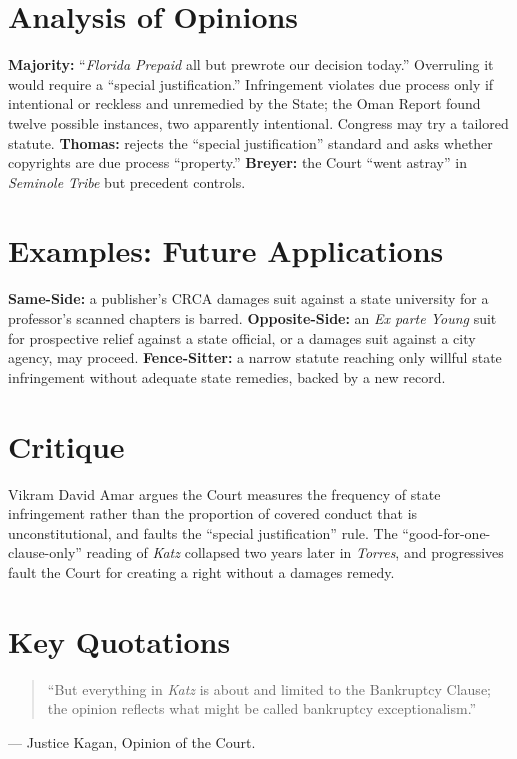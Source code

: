 \documentclass[12pt]{article}
\begin{document}
\section{Analysis of Opinions}
\textbf{Majority:} ``\textit{Florida Prepaid} all but prewrote our decision today.'' Overruling it would require a ``special justification.'' Infringement violates due process only if intentional or reckless and unremedied by the State; the Oman Report found twelve possible instances, two apparently intentional. Congress may try a tailored statute. \textbf{Thomas:} rejects the ``special justification'' standard and asks whether copyrights are due process ``property.'' \textbf{Breyer:} the Court ``went astray'' in \textit{Seminole Tribe} but precedent controls.

\section{Examples: Future Applications}
\textbf{Same-Side:} a publisher's CRCA damages suit against a state university for a professor's scanned chapters is barred. \textbf{Opposite-Side:} an \textit{Ex parte Young} suit for prospective relief against a state official, or a damages suit against a city agency, may proceed. \textbf{Fence-Sitter:} a narrow statute reaching only willful state infringement without adequate state remedies, backed by a new record.

\section{Critique}
Vikram David Amar argues the Court measures the frequency of state infringement rather than the proportion of covered conduct that is unconstitutional, and faults the ``special justification'' rule. The ``good-for-one-clause-only'' reading of \textit{Katz} collapsed two years later in \textit{Torres}, and progressives fault the Court for creating a right without a damages remedy.

\section{Key Quotations}
\begin{quote}
``But everything in \textit{Katz} is about and limited to the Bankruptcy Clause; the opinion reflects what might be called bankruptcy exceptionalism.''
\end{quote}
\noindent --- Justice Kagan, Opinion of the Court.
\end{document}
